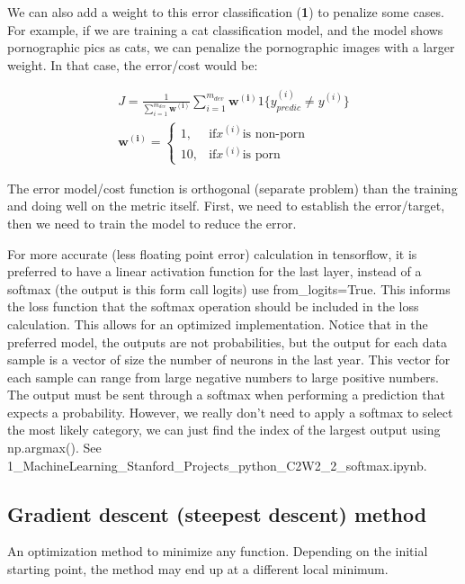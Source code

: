 \documentclass[12pt]{report}
\begin{document}
We can also add a weight to this error classification (\textbf{1}) to penalize some cases. For example, if we are training a cat classification model, and the model shows pornographic pics as cats, we can penalize the pornographic images with a larger weight. In that case, the error/cost would be:


\begin{align}
  J = \frac{1}{ \sum_{i = 1}^{m_{dev}} \mathbf{w^{(i)}} } \sum_{i = 1}^{m_{dev}} \mathbf{w^{(i)}} 1 \{y_{predic}^{(i)}  \neq y^{(i)} \}\\
  \mathbf{w^{(i)}} = \begin{cases}
    1, & \text{if} x^{(i)} \text{is non-porn} \\
    10, & \text{if} x^{(i)} \text{is porn}
  \end{cases}
\end{align}


The error model/cost function is orthogonal (separate problem) than the training and doing well on the metric itself. First, we need to establish the error/target, then we need to train the model to reduce the error.

For more accurate (less floating point error) calculation in tensorflow, it is preferred to have a linear activation function for the last layer, instead of a softmax (the output is this form call logits) use from\_logits=True. This informs the loss function that the softmax operation should be included in the loss calculation. This allows for an optimized implementation. Notice that in the preferred model, the outputs are not probabilities, but the output for each data sample is a vector of size the number of neurons in the last year. This vector for each sample can range from large negative numbers to large positive numbers. The output must be sent through a softmax when performing a prediction that expects a probability. However, we really don't need to apply a softmax to select the most likely category, we can just find the index of the largest output using np.argmax(). See 1\_MachineLearning\_Stanford\_Projects\_python\_C2W2\_2\_softmax.ipynb.



\subsection{Gradient descent (steepest descent) method}
\label{sec:gradient}

An optimization method to minimize any function. Depending on the initial starting point, the method may end up at a different local minimum. \\
\end{document}
